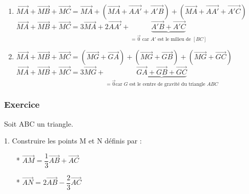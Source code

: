 \vspace*{1cm}

\begin{enumerate}


\item $\overrightarrow{MA} + \overrightarrow{MB} + \overrightarrow{MC} = \overrightarrow{MA} + \left(\overrightarrow{MA} + \overrightarrow{AA'} + \overrightarrow{A'B}\right) + \left(\overrightarrow{MA} + \overrightarrow{AA'} + \overrightarrow{A'C}\right) $\\

$ \overrightarrow{MA} + \overrightarrow{MB} + \overrightarrow{MC} = 3\overrightarrow{MA} + 2\overrightarrow{AA'} +$\hspace*{-0.94cm}$ \underbrace{\overrightarrow{A'B} + \overrightarrow{A'C}}_{= \overrightarrow{0} \textrm{ car } A' \textrm{ est le milieu de } \left[BC\right]}$ 

\item  $ \overrightarrow{MA} + \overrightarrow{MB} + \overrightarrow{MC} = \left(\overrightarrow{MG} + \overrightarrow{GA}\right) + \left(\overrightarrow{MG} + \overrightarrow{GB} \right) + \left(\overrightarrow{MG} + \overrightarrow{GC} \right) $\\

$ \overrightarrow{MA} + \overrightarrow{MB} + \overrightarrow{MC} =
3\overrightarrow{MG} + $\hspace*{-1.8cm}$\underbrace{\overrightarrow{GA} + \overrightarrow{GB} + \overrightarrow{GC}}_{=\overrightarrow{0} \textrm{car } G \textrm { est le centre de gravité du triangle } ABC} $

\end{enumerate}
\newpage
\subsubsection{Exercice }

Soit ABC un triangle.

1. Construire les points M et N définis par : \\

\begin{itemize}
\item[*] $ \overrightarrow{AM} = \dfrac{1}{3} \overrightarrow{AB} + \overrightarrow{AC} $ \\
\item[*] $ \overrightarrow{AN} = 2\overrightarrow{AB} - \dfrac{2}{3} \overrightarrow{AC} $ \\
\end{itemize}

